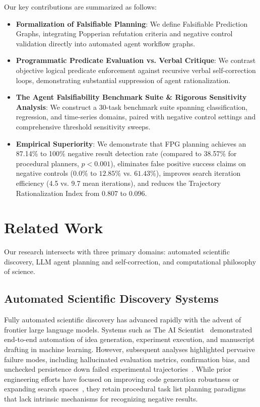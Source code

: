 \documentclass[11pt,letterpaper]{article}
\begin{document}
Our key contributions are summarized as follows:
\begin{itemize}
    \item \textbf{Formalization of Falsifiable Planning}: We define Falsifiable Prediction Graphs, integrating Popperian refutation criteria and negative control validation directly into automated agent workflow graphs.
    \item \textbf{Programmatic Predicate Evaluation vs. Verbal Critique}: We contrast objective logical predicate enforcement against recursive verbal self-correction loops, demonstrating substantial suppression of agent rationalization.
    \item \textbf{The Agent Falsifiability Benchmark Suite \& Rigorous Sensitivity Analysis}: We construct a 30-task benchmark suite spanning classification, regression, and time-series domains, paired with negative control settings and comprehensive threshold sensitivity sweeps.
    \item \textbf{Empirical Superiority}: We demonstrate that FPG planning achieves an 87.14\% to 100\% negative result detection rate (compared to 38.57\% for procedural planners, $p < 0.001$), eliminates false positive success claims on negative controls ($0.0\%$ to $12.85\%$ vs. $61.43\%$), improves search iteration efficiency (4.5 vs. 9.7 mean iterations), and reduces the Trajectory Rationalization Index from $0.807$ to $0.096$.
\end{itemize}

\section{Related Work}

Our research intersects with three primary domains: automated scientific discovery, LLM agent planning and self-correction, and computational philosophy of science.

\subsection{Automated Scientific Discovery Systems}
Fully automated scientific discovery has advanced rapidly with the advent of frontier large language models. Systems such as The AI Scientist~\citep{Lu2024} demonstrated end-to-end automation of idea generation, experiment execution, and manuscript drafting in machine learning. However, subsequent analyses highlighted pervasive failure modes, including hallucinated evaluation metrics, confirmation bias, and unchecked persistence down failed experimental trajectories~\citep{Lu2024}. While prior engineering efforts have focused on improving code generation robustness or expanding search spaces~\citep{Huang2023bench}, they retain procedural task list planning paradigms that lack intrinsic mechanisms for recognizing negative results.
\end{document}
